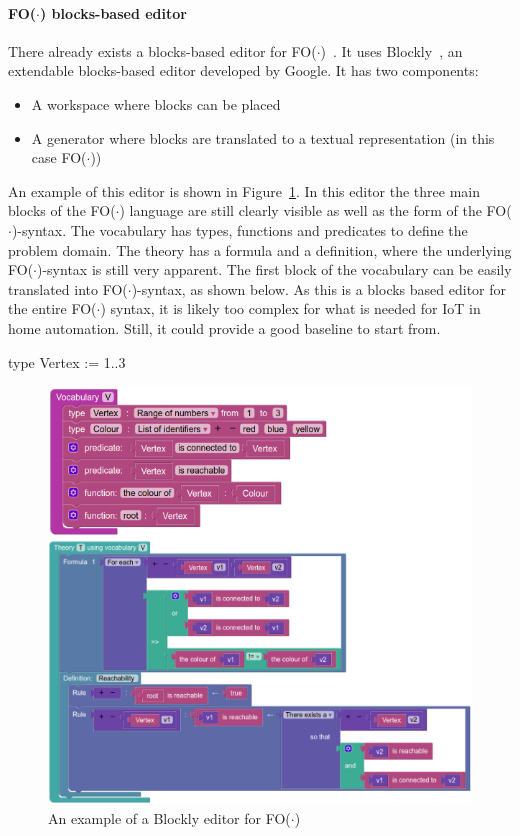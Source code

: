 \documentclass[11pt,a4paper]{report}
\newcommand{\fodot}{FO($\cdot$)\xspace}
\begin{document}
\paragraph{\fodot blocks-based editor}
There already exists a blocks-based editor for \fodot~\cite{IDPStructuredBlockbasedEditor}. It uses Blockly~\cite{Blockly}, an extendable blocks-based editor developed by Google. It has two components:
\begin{itemize}
	\item A workspace where blocks can be placed
	\item A generator where blocks are translated to a textual representation (in this case \fodot)
\end{itemize}
An example of this editor is shown in Figure~\ref{fig:blockly_IDP_example}. In this editor the three main blocks of the \fodot language are still clearly visible as well as the form of the \fodot-syntax. The vocabulary has types, functions and predicates to define the problem domain. The theory has a formula and a definition, where the underlying \fodot-syntax is still very apparent. The first block of the vocabulary can be easily translated into \fodot-syntax, as shown below. As this is a blocks based editor for the entire \fodot syntax, it is likely too complex for what is needed for IoT in home automation. Still, it could provide a good baseline to start from.
\begin{idplisting}
type Vertex := {1..3}
\end{idplisting}

\begin{figure}
    \centering
    \includegraphics[width=0.8\linewidth]{images/blockly_IDP_example.png}
    \caption{An example of a Blockly editor for \fodot~\cite{IDPStructuredBlockbasedEditor}}
    \label{fig:blockly_IDP_example}
\end{figure}
\end{document}
